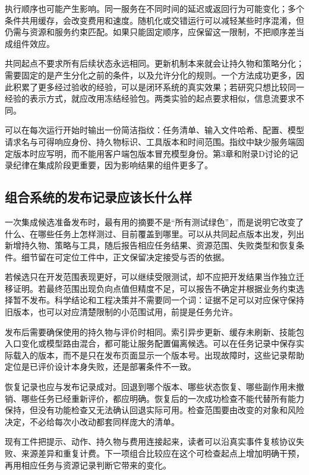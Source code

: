 执行顺序也可能产生影响。同一服务在不同时间的延迟或返回行为可能变化；多个条件共用缓存，会改变费用和速度。随机化或交错运行可以减轻某些时序混淆，但仍需与资源和服务约束匹配。如果只能固定顺序，应保留这一限制，不把顺序差当成组件效应。

共同起点不要求所有后续状态永远相同。更新机制本来就会让持久物和策略分化；需要固定的是产生分化之前的条件，以及允许分化的规则。一个方法成功更多，因此积累了更多经过验收的经验，可以是闭环系统的真实效果；若研究只想比较同一经验的表示方式，就应改用冻结经验包。两类实验的起点要求相似，信息流要求不同。

可以在每次运行开始时输出一份简洁指纹：任务清单、输入文件哈希、配置、模型请求名与可得响应身份、持久物标识、工具版本和时间范围。指纹中缺少服务端固定版本时应写明，而不能用客户端包版本冒充模型身份。第3章和附录D讨论的记录纪律在集成阶段更重要，因为影响结果的组件更多了。

\subsection{组合系统的发布记录应该长什么样}
\label{sec:ch15-release}

一次集成候选准备发布时，最有用的摘要不是“所有测试绿色”，而是说明它改变了什么、在哪些任务上怎样测过、目前覆盖到哪里。可以从共同起点版本出发，列出新增持久物、策略与工具，随后报告相应任务结果、资源范围、失败类型和恢复条件。细节留在可定位工件中，正文保留决定接受与否的依据。

若候选只在开发范围表现更好，可以继续受限测试，却不应把开发结果当作独立迁移证明。若最终范围出现负向点值但精度不足，可以报告不确定并根据业务约束选择暂不发布。科学结论和工程决策并不需要同一个词：证据不足可以对应保守保持旧版本，也可以对应清楚限制的小范围试用，前提是任务允许。

发布后需要确保使用的持久物与评价时相同。索引异步更新、缓存未刷新、技能包入口变化或模型路由混合，都可能让服务配置偏离候选。可以在任务记录中保存实际载入的版本，而不是只在发布页面显示一个版本号。出现故障时，这些记录帮助定位是已评价设计本身失败，还是部署条件不一致。

恢复记录也应与发布记录成对。回退到哪个版本、哪些状态恢复、哪些副作用未撤销、哪些任务已经重新评价，都应明确。恢复后的一次成功检查不能代替所有能力保持，但没有功能检查又无法确认回退实际可用。检查范围要由改变的对象和风险决定，不必给每次小改动都套同样庞大的清单。

现有工件把提示、动作、持久物与费用连接起来，读者可以沿真实事件复核协议失败、来源差异和重复计费。下一项组合比较应在这个可检查起点上增加明确干预，再用相应任务与资源记录判断它带来的变化。

